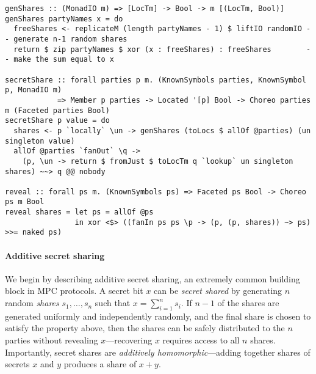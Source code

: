 \documentclass[sigplan,screen]{acmart}
\newcommand{\inlinecode}[2][haskell]{\texttt{#2}}
\begin{document}
\begin{figure*}
\begin{mdframed}
\begin{verbatim}
genShares :: (MonadIO m) => [LocTm] -> Bool -> m [(LocTm, Bool)]
genShares partyNames x = do
  freeShares <- replicateM (length partyNames - 1) $ liftIO randomIO -- generate n-1 random shares
  return $ zip partyNames $ xor (x : freeShares) : freeShares        -- make the sum equal to x

secretShare :: forall parties p m. (KnownSymbols parties, KnownSymbol p, MonadIO m)
            => Member p parties -> Located '[p] Bool -> Choreo parties m (Faceted parties Bool)
secretShare p value = do
  shares <- p `locally` \un -> genShares (toLocs $ allOf @parties) (un singleton value)
  allOf @parties `fanOut` \q ->
    (p, \un -> return $ fromJust $ toLocTm q `lookup` un singleton shares) ~~> q @@ nobody

reveal :: forall ps m. (KnownSymbols ps) => Faceted ps Bool -> Choreo ps m Bool
reveal shares = let ps = allOf @ps
                in xor <$> ((fanIn ps ps \p -> (p, (p, shares)) ~> ps) >>= naked ps)
\end{verbatim}
\caption{Choreographies for secret sharing \inlinecode{p}'s secret value among \inlinecode{parties}
         and for revealing a secret-shared value.
         \inlinecode{p} constructs secret shares locally (line~9),
         then sends one share to each party (lines~10--11), including themselves.
         The result is a \inlinecode{Faceted} value---each
         party has one secret share of the secret.}
\label{fig:secret-sharing}
\end{mdframed}
\end{figure*}

\paragraph{Additive secret sharing}
We begin by describing additive secret sharing, an extremely common building block in MPC protocols. A secret bit $x$ can be \emph{secret shared} by generating $n$ random \emph{shares} $s_1, \dots, s_n$ such that $x = \sum_{i=1}^n s_i$. If $n-1$ of the shares are generated uniformly and independently randomly, and the final share is chosen to satisfy the property above, then the shares can be safely distributed to the $n$ parties without revealing $x$---recovering $x$ requires access to all $n$ shares. Importantly, secret shares are \emph{additively homomorphic}---adding together shares of secrets $x$ and $y$ produces a share of $x+y$. 
\end{document}
